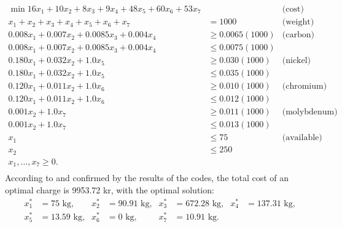 \documentclass[a4paper,10 pt,titlepage,twoside]{book}
\theoremstyle{plain}
\theoremstyle{definition}
\theoremstyle{remark}
\begin{document}
\begin{align*}
\min16x_{1}+10x_{2}+8x_{3}+9x_{4}+48x_{5}+60x_{6}+53x_{7}& &\text{(cost)}&\\
x_{1}+x_{2}+x_{3}+x_{4}+x_{5}+x_{6} + x_{7}&= 1000&\text{(weight)}&\\
0.008x_{1}+0.007x_{2}+0.0085x_{3}+0.004x_{4}&\geq 0.0065(1000)&\text{(carbon)}&\\
0.008x_{1}+0.007x_{2} + 0.0085x_{3} + 0.004x_{4}&\leq 0.0075(1000)&\\
0.180x_{1}+0.032x_{2} + 1.0x_{5}&\geq 0.030(1000)& \text{(nickel)}&\\
0.180x_{1}+0.032x_{2} + 1.0x_{5}&\leq 0.035(1000)&\\
0.120x_{1}+0.011x_{2} + 1.0x_{6}&\geq 0.010(1000)& \text{(chromium)}&\\
0.120x_{1}+0.011x_{2} + 1.0x_{6}&\leq 0.012(1000)&\\
0.001x_{2} + 1.0x_{7}&\geq 0.011(1000)& \text{(molybdenum)}&\\
0.001x_{2} + 1.0x_{7}&\leq 0.013(1000)&\\
x_{1}&\leq 75&\text{(available)}&\\
x_{2}&\leq 250 &&\\
x_{1},\dots, x_{7}\geq 0.\\
\end{align*}
According to \cite{RR} and confirmed by the results of the codes, the total cost of an optimal charge is 9953.72 kr, with the optimal solution:
\begin{align*}
x_{1}^{*} &=  75\text{ kg,} & x_{2}^{*}&=  90.91\text{ kg,} & x_{3}^{*} &= 672.28 \text{ kg,} & x_{4}^{*} &= 137.31 \text{ kg,}\\
x_{5}^{*} &= 13.59 \text{ kg,}& x_{6}^{*}&= 0\text{ kg,}  & x_{7}^{*} &= 10.91 \text{ kg.} &&\\
\end{align*}
\end{document}
